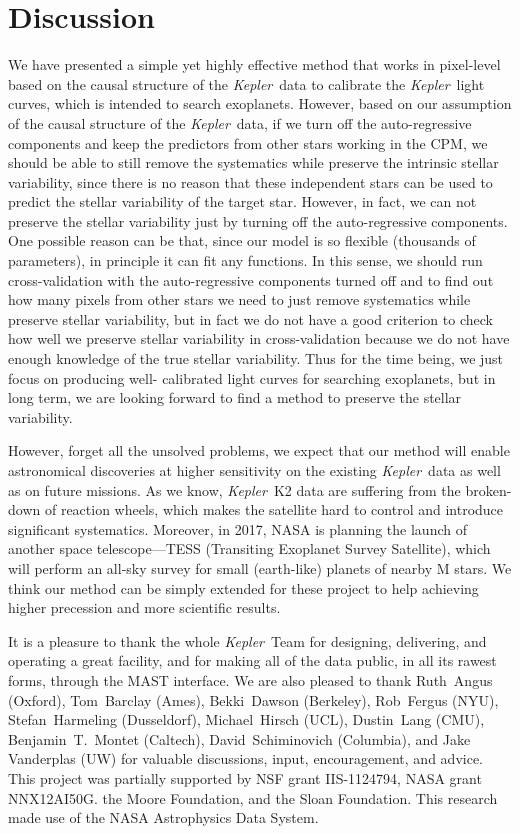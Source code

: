 \documentclass[12pt, preprint]{aastex}
\newcommand{\project}[1]{\textsl{#1}}
\newcommand{\Kepler}{\project{Kepler}}
\newcommand{\name}{CPM}
\begin{document}
\section{Discussion}
We have presented a simple yet highly effective method that works in pixel-level 
based on the causal structure of the \Kepler\ data to calibrate the \Kepler\ light curves, 
which is intended to search exoplanets. 
However, based on our assumption of the causal structure of the \Kepler\ 
data, if we turn off the auto-regressive components and keep the predictors from other
stars working  in the \name, we should be able to still remove the systematics while
preserve the intrinsic stellar  variability, since there is no reason that these independent
stars can be used to predict the stellar variability of the target star. However, in fact, we
can not preserve the stellar variability just by turning off the auto-regressive 
components. One possible reason can be that, since our model is so flexible 
(thousands of parameters), in principle it can fit any functions. In this sense, we should 
run cross-validation with the auto-regressive components turned off and to find out how
many pixels from other stars we need to just remove systematics while preserve stellar
variability, but in fact we do not have a good criterion to check how well we preserve
stellar variability in cross-validation because we do not have enough knowledge of the 
true stellar variability. Thus for the time being, we just focus on producing well-
calibrated light curves for searching exoplanets, but in long term, we are looking
forward to find a method to preserve the stellar variability.

However, forget all the unsolved problems, we expect that our method will enable
astronomical discoveries at higher sensitivity on the existing \Kepler\ data as well as on
future missions.  As we know, \Kepler\ K2 data are suffering from the broken-down of
reaction wheels, which makes the satellite hard to control and introduce significant
systematics. Moreover, in 2017, NASA is planning the launch of another space 
telescope---TESS (Transiting Exoplanet Survey Satellite), which will perform an all-sky 
survey for small (earth-like) planets of nearby M stars. We think our method can be simply
extended for these project to help achieving higher precession and more scientific results. 


\acknowledgements
It is a pleasure to thank the whole \Kepler\ Team
  for designing, delivering, and operating a great facility,
  and for making all of the data public, in all its rawest forms, through the MAST interface.
We are also pleased to thank
  Ruth~Angus (Oxford),
  Tom~Barclay (Ames),
  Bekki~Dawson (Berkeley),
  Rob~Fergus (NYU),
  Stefan~Harmeling (Dusseldorf),
  Michael~Hirsch (UCL),
  Dustin~Lang (CMU),
  Benjamin~T.~Montet (Caltech),
  David~Schiminovich (Columbia),
  and
  Jake Vanderplas (UW)
for valuable discussions, input, encouragement, and advice.
This project was partially supported by
  NSF grant IIS-1124794,
  NASA grant NNX12AI50G.
  the Moore Foundation,
  and
  the Sloan Foundation.
This research made use of the NASA Astrophysics Data System.

\clearpage
\end{document}
